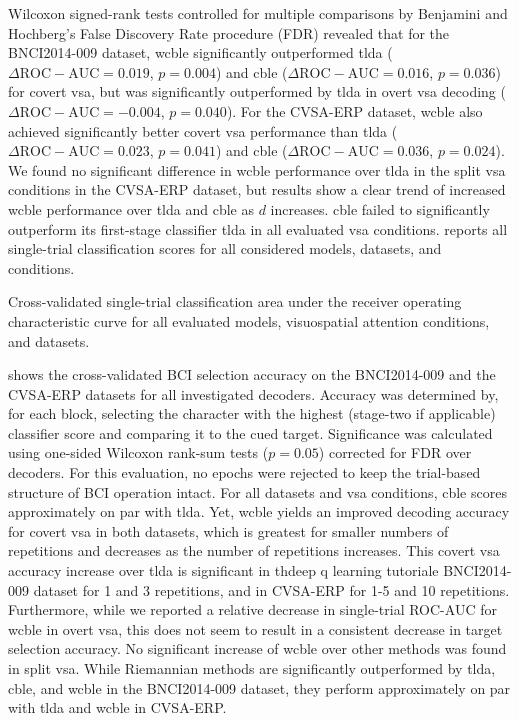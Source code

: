 Wilcoxon signed-rank tests controlled for multiple comparisons by Benjamini
and Hochberg's False Discovery Rate procedure (FDR) revealed that
for the BNCI2014-009 dataset, \ac{wcble} significantly outperformed \ac{tlda}
($\Delta\mathrm{ROC-AUC} = 0.019$, $p=0.004$) and \ac{cble}
($\Delta\mathrm{ROC-AUC} = 0.016$, $p=0.036$) for covert \ac{vsa},
but was significantly outperformed by \ac{tlda} in overt \ac{vsa} decoding
($\Delta\mathrm{ROC-AUC}=-0.004$, $p=0.040$).
For the CVSA-ERP dataset, \ac{wcble}
also achieved significantly better covert \ac{vsa} performance than \ac{tlda} ($\Delta\mathrm{ROC-AUC}
	= 0.023$, $p=0.041$) and \ac{cble} ($\Delta\mathrm{ROC-AUC}
	= 0.036$, $p=0.024$).
We found no significant difference in \ac{wcble} performance over \ac{tlda} in the split
\ac{vsa} conditions in the CVSA-ERP dataset, but results show a clear trend of
increased \ac{wcble} performance over \ac{tlda} and \ac{cble} as $d$ increases.
\ac{cble} failed to significantly outperform its first-stage classifier \ac{tlda} in all
evaluated \ac{vsa} conditions.
 reports all single-trial classification scores for all considered models, datasets,
and conditions.

\begin{table}
  \centering
  \makebox[\textwidth][c]{%
    
  }
  \caption{Cross-validated single-trial classification area under the receiver operating characteristic
curve for all evaluated models, visuospatial attention conditions, and
  datasets.}
  \label{tab:covert-align/results/single-trial}
\end{table}


 shows the cross-validated BCI selection
accuracy on the BNCI2014-009 and the CVSA-ERP datasets for all investigated
decoders.
Accuracy was determined by, for each block, selecting the character with the
highest (stage-two if applicable) classifier score and comparing it to the cued target.
Significance was calculated using one-sided Wilcoxon rank-sum tests ($p=0.05$)
corrected for FDR over decoders.
For this evaluation, no epochs were rejected to keep the trial-based structure of BCI
operation intact.
For all datasets and \ac{vsa} conditions, \ac{cble} scores approximately on par with \ac{tlda}.
Yet, \ac{wcble} yields an improved decoding accuracy for covert \ac{vsa} in both
datasets, which is greatest for smaller numbers of repetitions and
decreases as the number of repetitions increases.
This covert \ac{vsa} accuracy increase over \ac{tlda} is significant in thdeep q learning tutoriale BNCI2014-009 dataset
for 1 and 3 repetitions, and in CVSA-ERP for 1-5 and 10 repetitions.
Furthermore, while we reported a relative decrease in single-trial ROC-AUC for
\ac{wcble} in overt \ac{vsa}, this does not seem to result in a consistent decrease in target
selection accuracy.
No significant increase of \ac{wcble} over other methods was found in split \ac{vsa}.
While Riemannian methods are significantly outperformed by \ac{tlda}, \ac{cble}, and \ac{wcble}
in the BNCI2014-009 dataset, they perform approximately on par with \ac{tlda} and
\ac{wcble} in CVSA-ERP.

